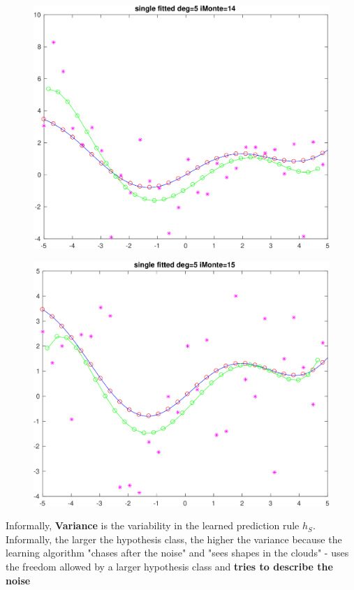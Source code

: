 \documentclass[11pt]{article}
\begin{document}
\begin{figure}[h!]
\centering\includegraphics[scale=0.1]{single_poly_d_5_iMonte_14.png}
\end{figure}

\begin{figure}[h!]
\centering\includegraphics[scale=0.1]{single_poly_d_5_iMonte_15.png}
\end{figure}


\newpage


 Informally, {\bf Variance} is the variability in the learned prediction  rule $h_S$.
 Informally, the larger the hypothesis class, the higher the variance because the learning algorithm "chases after the noise" and "sees shapes in the clouds" - uses the freedom allowed by a larger hypothesis class
 and {\bf tries to describe the noise}
\end{document}
